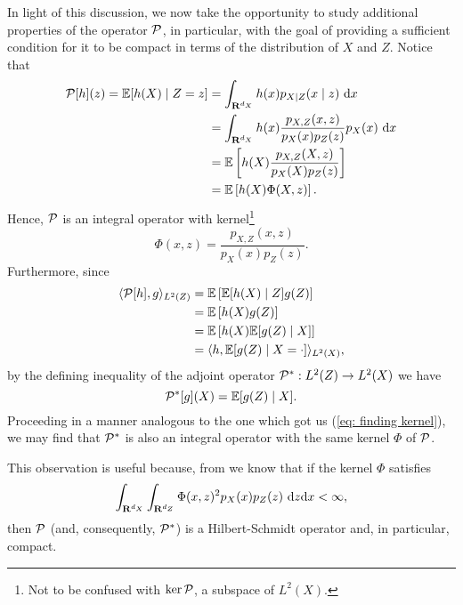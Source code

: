 In light of this discussion, we now take the opportunity to study additional properties of the operator $ \mathcal{P} $, in particular, with the goal of providing a sufficient condition for it to be compact in terms of the distribution of $ X $ and $ Z $.
Notice that
\begin{align}
    \mathcal{P} [ h ] ( z )
    = \mathbb{E} [ h ( X ) \mid Z = z ] 
    &= \int_{ \mathbf{R}^{ d_{ X } } } h ( x ) p_{ X \mid Z } ( x \mid z ) \ \mathrm{d} x \nonumber \\
    &= \int_{ \mathbf{R}^{ d_{ X } } } h ( x ) \frac{ p_{ X, Z } ( x, z ) }{ p_{ X } ( x ) p_{ Z } ( z ) } p_{ X } ( x ) \ \mathrm{d} x \nonumber \\
    &= \mathbb{E} \left[
        h ( X ) \frac{ p_{ X, Z } ( X, z ) }{ p_{ X } ( X ) p_{ Z } ( z ) }
    \right] \nonumber \\
    &= \mathbb{E} \left[ h ( X ) \Phi ( X, z ) \right] \label{eq: finding kernel}
.\end{align}
Hence, $ \mathcal{P} $ is an integral operator with kernel\footnote{Not to be confused with $ \ker \mathcal{P} $, a subspace of $ L^{ 2 } ( X ) $.}
\begin{equation*}
    \Phi ( x, z ) = \frac{ p_{ X, Z } ( x, z ) }{ p_{ X } ( x ) p_{ Z } ( z ) }
.\end{equation*}
Furthermore, since
\begin{align*}
    \langle  \mathcal{P}[h], g  \rangle_{ L^{ 2 } ( Z ) }
    &= \mathbb{E} \left[ \mathbb{E} [ h ( X ) \mid Z ] g ( Z ) \right] \\
    &= \mathbb{E} \left[ h ( X ) g ( Z ) \right] \\
    &= \mathbb{E} \left[ h ( X ) \mathbb{E} [ g ( Z ) \mid X ] \right] \\
    &= \langle  h, \mathbb{E} [ g ( Z ) \mid X = \cdot ]  \rangle_{ L^{ 2 } ( X ) }
,\end{align*}
by the defining inequality of the adjoint operator $ \mathcal{P}^{ * } : L^{ 2 } ( Z ) \to L^{ 2 } ( X ) $ we have
\begin{equation*}
    \mathcal{P}^{ * } [ g ] ( X ) = \mathbb{E} [ g ( Z ) \mid X ]
.\end{equation*}
Proceeding in a manner analogous to the one which got us (\ref{eq: finding kernel}), we may find that $ \mathcal{P}^{ * } $ is also an integral operator with the same kernel $ \Phi $ of $ \mathcal{P} $.

This observation is useful because, from \cite[theorem 2.34]{florens2007} we know that if the kernel $ \Phi $ satisfies
\begin{equation}
    \label{eq: Phi square integrable}
    \int_{ \mathbf{R}^{ d_{ X } } } \int_{ \mathbf{R}^{ d_{ Z } } } \Phi ( x, z )^2 p_{ X } ( x ) p_{ Z } ( z ) \ \mathrm{d} z \mathrm{d} x < \infty
,\end{equation}
then $ \mathcal{P} $ (and, consequently, $ \mathcal{P}^{ * } $) is a Hilbert-Schmidt operator and, in particular, compact.

